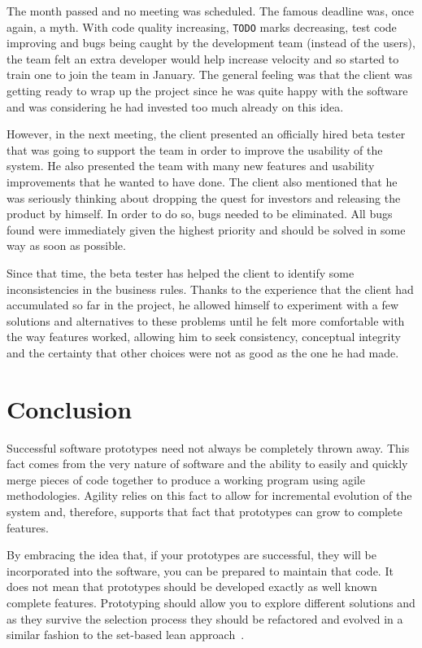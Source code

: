 \documentclass[lnbip]{svmultln}
\begin{document}
The month passed and no meeting was scheduled. The famous deadline
was, once again, a myth. With code quality increasing, \texttt{TODO}
marks decreasing, test code improving and bugs being caught by the
development team (instead of the users), the team felt an extra
developer would help increase velocity and so started to train one to
join the team in January. The general feeling was that the client was
getting ready to wrap up the project since he was quite happy with the
software and was considering he had invested too much already on this
idea.

However, in the next meeting, the client presented an officially hired
beta tester that was going to support the team in order to improve the
usability of the system. He also presented the team with many new
features and usability improvements that he wanted to have done. The
client also mentioned that he was seriously thinking about dropping
the quest for investors and releasing the product by himself. In order
to do so, bugs needed to be eliminated. All bugs found were
immediately given the highest priority and should be solved in some
way as soon as possible.

Since that time, the beta tester has helped the client to identify
some inconsistencies in the business rules. Thanks to the experience
that the client had accumulated so far in the project, he allowed
himself to experiment with a few solutions and alternatives to these
problems until he felt more comfortable with the way features worked,
allowing him to seek consistency, conceptual integrity and the
certainty that other choices were not as good as the one he had made.

\section{Conclusion}
\label{sec:conclusion}

Successful software prototypes need not always be completely thrown
away. This fact comes from the very nature of software and the ability
to easily and quickly merge pieces of code together to produce a
working program using agile methodologies. Agility relies on this fact
to allow for incremental evolution of the system and, therefore,
supports that fact that prototypes can grow to complete features.

By embracing the idea that, if your prototypes are successful, they
will be incorporated into the software, you can be prepared to
maintain that code. It does not mean that prototypes should be
developed exactly as well known complete features. Prototyping should
allow you to explore different solutions and as they survive the
selection process they should be refactored and evolved in a similar
fashion to the set-based lean approach~\cite{Poppendieck2009}.
\end{document}
